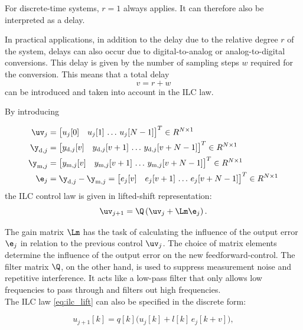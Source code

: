 \documentclass[conference]{IEEEtran}
\begin{document}
For discrete-time systems, $r=1$ always applies.  It can therefore
also be interpreted as a delay.

In practical applications, in addition to the delay due to the
relative degree $r$ of the system, delays can also occur due to
digital-to-analog or analog-to-digital conversions. This delay is
given by the number of sampling steps $w$ required for the conversion.
This means that a total delay
\begin{equation}  \label{eq:m}
  v = r + w
\end{equation} can be introduced and taken into account in the ILC law.

By introducing

\begin{align}
	\label{eq:u_vec}
	\uv_j &= \bigl[u_j[0] \quad u_j[1] \,  \ldots \, u_j[N-1] \bigr]^T \in R^{N \times 1} \\
	\y_{\mathrm{d},j} &= \bigl[y_{\mathrm{d},j}[v] \quad y_{\mathrm{d},j}[v+1] \, \ldots \, y_{\mathrm{d},j}[v+N-1] \bigr]^T \in R^{N \times 1} \\
	\y_{\mathrm{m},j} &= \bigl[y_{\mathrm{m},j}[v] \quad y_{\mathrm{m},j}[v+1] \, \ldots \, y_{\mathrm{m},j}[v+N-1] \bigr]^T \in R^{N \times 1} \\
	\e_{j} &= \y_{\mathrm{d},j} - \y_{\mathrm{m},j} = \bigl[e_{j}[v] \quad e_{j}[v+1] \, \ldots \, e_{j}[v+N-1] \bigr]^T \in R^{N \times 1} \label{eq:evec_def}
\end{align}
the ILC control law is given in lifted-shift representation:
\begin{equation}
	\label{eq:ilc_lift}
	\uv_{j+1} = \Q\left(\uv_j + \Lm \e_j\right).
\end{equation}


The gain matrix $\Lm$ has the task of calculating the influence of the
output error $\e_j$ in relation to the previous control $\uv_j$. The
choice of matrix elements determine the influence of the output error
on the new feedforward-control.  The filter matrix $\Q$, on the other
hand, is used to suppress measurement noise and  repetitive
interference. It acts like a low-pass filter that only allows low
frequencies to pass through and filters out high frequencies. \\

The ILC law \eqref{eq:ilc_lift} can also be specified in the discrete
form:

\begin{equation}
	\label{eq:ilc_diskret}
	u_{j+1}[k] = q[k] \bigl(u_j[k] + l[k] \, e_j[k+v]\bigr),
\end{equation}
\end{document}
